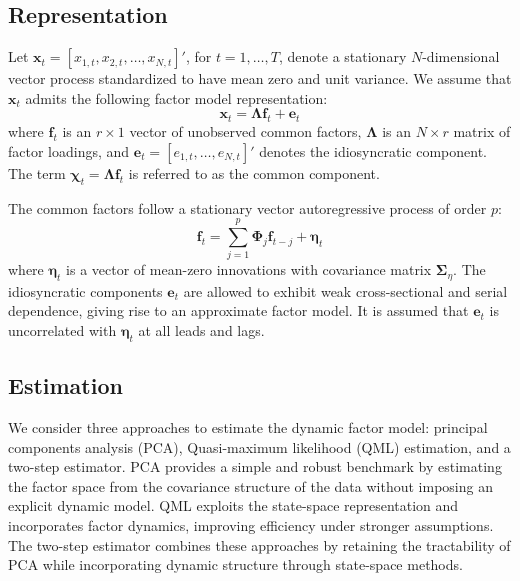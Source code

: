 \subsection{Representation}\label{representation}

Let $\boldsymbol{x}_t = [x_{1,t}, x_{2,t}, \dots, x_{N,t}]'$, for $t = 1, \dots, T$, denote a stationary $N$-dimensional vector process standardized to have mean zero and unit variance. We assume that $\boldsymbol{x}_t$ admits the following factor model representation:
\begin{equation}
\boldsymbol{x}_t = \boldsymbol{\Lambda} \boldsymbol{f}_t + \boldsymbol{e}_t
\end{equation}
where $\boldsymbol{f}_t$ is an $r \times 1$ vector of unobserved common factors, $\boldsymbol{\Lambda}$ is an $N \times r$ matrix of factor loadings, and $\boldsymbol{e}_t = [e_{1,t}, \dots, e_{N,t}]'$ denotes the idiosyncratic component. The term $\boldsymbol{\chi}_t = \boldsymbol{\Lambda} \boldsymbol{f}_t$ is referred to as the common component.

The common factors follow a stationary vector autoregressive process of order $p$:
\begin{equation}
\boldsymbol{f}_t = \sum_{j=1}^{p} \boldsymbol{\Phi}_j \boldsymbol{f}_{t-j} + \boldsymbol{\eta}_t
\end{equation}
where $\boldsymbol{\eta}_t$ is a vector of mean-zero innovations with covariance matrix $\boldsymbol{\Sigma}_{\eta}$. The idiosyncratic components $\boldsymbol{e}_t$ are allowed to exhibit weak cross-sectional and serial dependence, giving rise to an approximate factor model. It is assumed that $\boldsymbol{e}_t$ is uncorrelated with $\boldsymbol{\eta}_t$ at all leads and lags.

\subsection{Estimation}

We consider three approaches to estimate the dynamic factor model: principal components analysis (PCA), Quasi-maximum likelihood (QML) estimation, and a two-step estimator. PCA provides a simple and robust benchmark by estimating the factor space from the covariance structure of the data without imposing an explicit dynamic model. QML exploits the state-space representation and incorporates factor dynamics, improving efficiency under stronger assumptions. The two-step estimator combines these approaches by retaining the tractability of PCA while incorporating dynamic structure through state-space methods.


